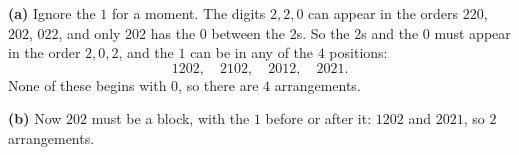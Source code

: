 \textbf{(a)} Ignore the $1$ for a moment. The digits $2,2,0$ can appear in the orders $220$, $202$, $022$, and only $202$ has the $0$ between the $2$s. So the $2$s and the $0$ must appear in the order $2,0,2$, and the $1$ can be in any of the $4$ positions:
\[1202,\quad 2102,\quad 2012,\quad 2021.\]
None of these begins with $0$, so there are $\boxed{4}$ arrangements.

\textbf{(b)} Now $202$ must be a block, with the $1$ before or after it: $1202$ and $2021$, so $\boxed{2}$ arrangements.
